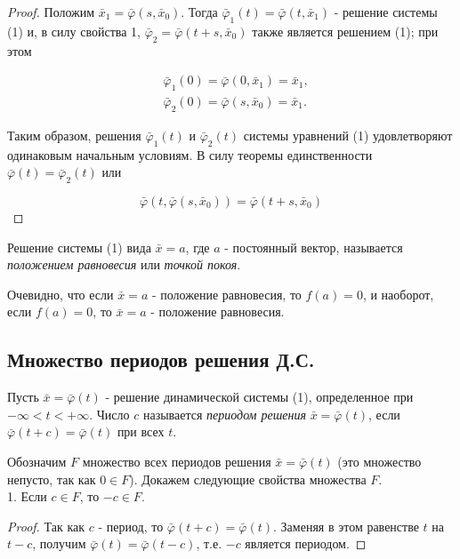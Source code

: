 \documentclass{article}
\theoremstyle{definition} \newtheorem*{theorem*}{Теорема}
\theoremstyle{plain} \newtheorem{theorem}{Теорема}[section]
\theoremstyle{definition} \newtheorem*{corollary*}{Следствие}
\theoremstyle{definition} \newtheorem{corollary}{Следствие}[section]
\begin{document}
\begin{proof}
Положим $\bar{x}_1 = \bar{\varphi}(s, \bar{x}_0)$.
Тогда $\bar{\varphi}_1(t) = \bar{\varphi}(t, \bar{x}_1)$
- решение системы (1) и, в силу свойства 1,
$\bar{\varphi}_2 = \bar{\varphi}(t + s, \bar{x}_0)$
также является решением (1); при этом

\begin{align*}
    &\bar{\varphi}_1(0)
    = \bar{\varphi}(0, \bar{x}_1)
    = \bar{x}_1,\\
    &\bar{\varphi}_2(0)
    = \bar{\varphi}(s, \bar{x}_0)
    = \bar{x}_1.
\end{align*}

Таким образом, решения $\bar{\varphi}_1(t)$ и
$\bar{\varphi}_2(t)$ системы уравнений (1) удовлетворяют
одинаковым начальным условиям. В силу теоремы единственности
$\bar{\varphi}(t) = \bar{\varphi}_2(t)$ или

\begin{equation*}
    \bar{\varphi}(t, \bar{\varphi}(s, \bar{x}_0))
    = \bar{\varphi}(t + s, \bar{x}_0)
\end{equation*}

\end{proof}

Решение системы (1) вида $\bar{x} = a$, где $a$
- постоянный вектор, называется
\textit{положением равновесия} или \textit{точкой покоя}.

Очевидно, что если $\bar{x} = a$ - положение равновесия,
то $f(a) = 0$, и наоборот,
если $f(a) = 0$, то $\bar{x} = a$ - положение равновесия.

\subsection*{Множество периодов решения Д.С.}

Пусть $\bar{x} = \bar{\varphi}(t)$ - решение динамической
системы (1), определенное при $- \infty < t < + \infty$.
Число $c$ называется \textit{периодом решения}
$\bar{x} = \bar{\varphi}(t)$, если $\bar{\varphi}(t + c) =
\bar{\varphi}(t)$ при всех $t$.

Обозначим $F$ множество всех периодов решения
$\bar{x} = \bar{\varphi}(t)$ (это множество непусто,
так как $0 \in F$). Докажем следующие свойства множества $F$.
\\

1. Если $c \in F$, то $-c \in F$.
\begin{proof}
Так как $c$ - период, то
$\bar{\varphi}(t + c) = \bar{\varphi}(t)$.
Заменяя в этом равенстве $t$ на $t - c$, получим
$\bar{\varphi}(t) = \bar{\varphi}(t - c)$,
т.е. $-c$ является периодом.
\end{proof}
\end{document}
